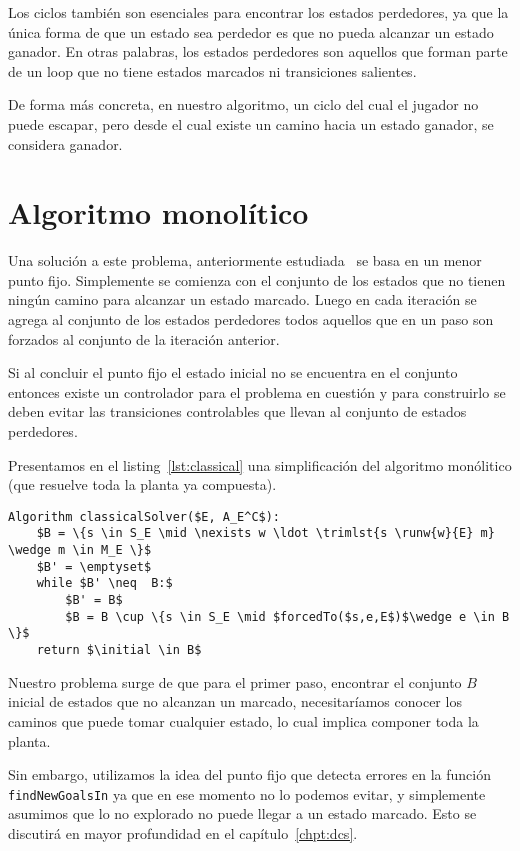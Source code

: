 Los ciclos también son esenciales para encontrar los estados perdedores, ya que la única forma de que un estado sea perdedor es que no pueda alcanzar un estado ganador. En otras palabras, los estados perdedores son aquellos que forman parte de un loop que no tiene estados marcados ni transiciones salientes.

De forma más concreta, en nuestro algoritmo, un ciclo del cual el jugador no puede escapar, pero desde el cual existe un camino hacia un estado ganador, se considera ganador.

\section{Algoritmo monolítico} \label{chpt:algoMono}

Una solución a este problema, anteriormente estudiada~\cite{Ehlers:EECS-2013-162} se basa en un menor punto fijo. Simplemente se comienza con el conjunto de los estados que no tienen ningún camino para alcanzar un estado marcado. Luego en cada iteración se agrega al conjunto de los estados perdedores todos aquellos que en un paso son forzados al conjunto de la iteración anterior. 

Si al concluir el punto fijo el estado inicial no se encuentra en el conjunto entonces existe un controlador para el problema en cuestión y para construirlo se deben evitar las transiciones controlables que llevan al conjunto de estados perdedores.

Presentamos en el listing~\ref{lst:classical} una simplificación del algoritmo monólitico (que resuelve toda la planta ya compuesta).

\begin{lstlisting}[language={pseudocode},label={lst:classical},caption={Algoritmo Monolitico},float=ht]
Algorithm classicalSolver($E, A_E^C$):
	$B = \{s \in S_E \mid \nexists w \ldot \trimlst{s \runw{w}{E} m} \wedge m \in M_E \}$
	$B' = \emptyset$
	while $B' \neq  B:$
		$B' = B$
		$B = B \cup \{s \in S_E \mid $forcedTo($s,e,E$)$\wedge e \in B \}$
	return $\initial \in B$
\end{lstlisting}

Nuestro problema surge de que para el primer paso, encontrar el conjunto $B$ inicial de estados que no alcanzan un marcado, necesitaríamos conocer los caminos que puede tomar cualquier estado, lo cual implica componer toda la planta.

Sin embargo, utilizamos la idea del punto fijo que detecta errores en la función \texttt{findNewGoalsIn} ya que en ese momento no lo podemos evitar, y simplemente asumimos que lo no explorado no puede llegar a un estado marcado. Esto se discutirá en mayor profundidad en el capítulo~\ref{chpt:dcs}.

